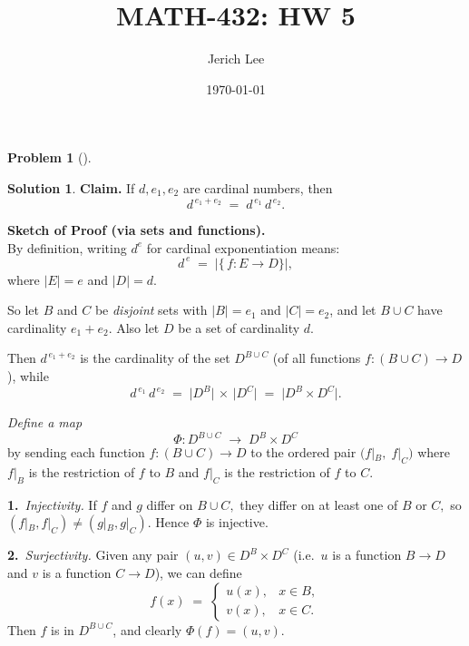 \documentclass[12pt]{article}
\title{MATH-432: HW 5}
\author{Jerich Lee}
\date{\today}
\theoremstyle{definition} %
\newtheorem{solution}{Solution}
\newtheorem{problem}{Problem}
\theoremstyle{plain} %
\begin{document}
\maketitle
\begin{problem}[]
    
\end{problem}
\begin{solution}
    \noindent
    \textbf{Claim.} If $d,e_1,e_2$ are cardinal numbers, then
    \[
    d^{\,e_1 + e_2} \;=\; d^{\,e_1}\,d^{\,e_2}.
    \]
    
    \medskip
    
    \noindent
    \textbf{Sketch of Proof (via sets and functions).}\\
    By definition, writing $d^{e}$ for cardinal exponentiation means: 
    \[
    d^{\,e} \;=\; \bigl|\{\,f: E \to D \}\bigr|,
    \]
    where $|E|=e$ and $|D|=d$.  
    
    \smallskip
    
    \noindent
    So let $B$ and $C$ be \emph{disjoint} sets with $|B|=e_1$ and $|C|=e_2$, 
    and let $B \cup C$ have cardinality $e_1 + e_2.$  
    Also let $D$ be a set of cardinality $d.$
    
    \smallskip
    
    \noindent
    Then $d^{\,e_1 + e_2}$ is the cardinality of the set $D^{B \cup C}$ 
    (of all functions $f:(B \cup C)\to D$), 
    while 
    \[
    d^{\,e_1}\,d^{\,e_2} \;=\; \bigl|D^B\bigr| \,\times\, \bigl|D^C\bigr|
    \;=\; \bigl|D^B \times D^C\bigr|.
    \]
    
    \smallskip
    
    \noindent
    \emph{Define a map}
    \[
    \Phi: D^{B \cup C}\;\longrightarrow\; D^B \times D^C
    \]
    by sending each function $f:(B \cup C)\to D$ 
    to the ordered pair $\bigl(f|_B,\;f|_C\bigr)$ 
    where $f|_B$ is the restriction of $f$ to $B$ 
    and $f|_C$ is the restriction of $f$ to $C.$  
    
    \smallskip
    
    \noindent
    \textbf{1.}\ \emph{Injectivity.}  
    If $f$ and $g$ differ on $B \cup C,$ 
    they differ on at least one of $B$ or $C,$ 
    so $(f|_B,f|_C)\neq(g|_B,g|_C).$  
    Hence $\Phi$ is injective.
    
    \smallskip
    
    \noindent
    \textbf{2.}\ \emph{Surjectivity.}  
    Given any pair $(u,v)\in D^B\times D^C$ (i.e.\ $u$ is a function $B\to D$ and $v$ is a function $C\to D$), 
    we can define 
    \[
    f(x)\;=\;\begin{cases}
    u(x), & x\in B,\\[6pt]
    v(x), & x\in C.
    \end{cases}
    \]
    Then $f$ is in $D^{B \cup C}$, 
    and clearly $\Phi(f)=(u,v).$
    

\end{solution}
\end{document}
